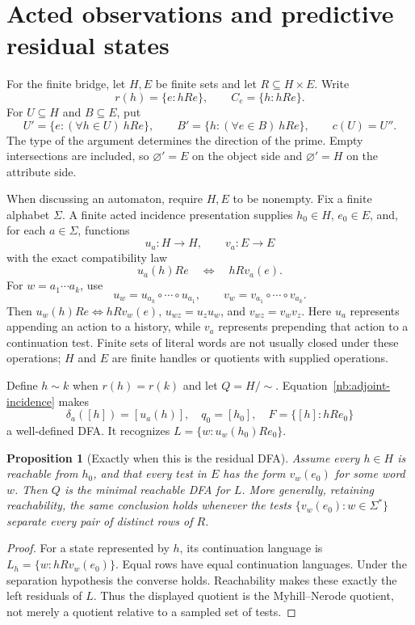 \documentclass[11pt]{article}
\newtheorem{proposition}[theorem]{Proposition}
\theoremstyle{remark}
\begin{document}
\section{Acted observations and predictive residual states}

For the finite bridge, let $H,E$ be finite sets and let $R\subseteq H\times E$. Write
\[
 r(h)=\{e:hRe\},\qquad C_e=\{h:hRe\}.
\]
For $U\subseteq H$ and $B\subseteq E$, put
\[
 U'=\{e:(\forall h\in U)\ hRe\},\qquad
 B'=\{h:(\forall e\in B)\ hRe\},\qquad c(U)=U''.
\]
The type of the argument determines the direction of the prime. Empty
intersections are included, so $\varnothing'=E$ on the object side and
$\varnothing'=H$ on the attribute side.

When discussing an automaton, require $H,E$ to be nonempty.
Fix a finite alphabet $\Sigma$. A finite acted incidence presentation supplies
$h_0\in H$, $e_0\in E$, and, for each $a\in\Sigma$, functions
\[
 u_a:H\longrightarrow H,\qquad v_a:E\longrightarrow E
\]
with the exact compatibility law
\begin{equation}
 u_a(h)Re\quad\Longleftrightarrow\quad hRv_a(e).
 \label{nb:adjoint-incidence}
\end{equation}
For $w=a_1\cdots a_k$, use
\[
 u_w=u_{a_k}\circ\cdots\circ u_{a_1},\qquad
 v_w=v_{a_1}\circ\cdots\circ v_{a_k}.
\]
Then $u_w(h)Re\Longleftrightarrow hRv_w(e)$,
$u_{wz}=u_z u_w$, and $v_{wz}=v_wv_z$.
Here $u_a$ represents appending an action to a history, while $v_a$
represents prepending that action to a continuation test. Finite sets of
literal words are not usually closed under these operations; $H$ and $E$
are finite handles or quotients with supplied operations.

Define $h\sim k$ when $r(h)=r(k)$ and let $Q=H/{\sim}$.
Equation~\eqref{nb:adjoint-incidence} makes
\[
 \delta_a([h])=[u_a(h)],\quad q_0=[h_0],\quad
 F=\{[h]:hRe_0\}
\]
a well-defined DFA. It recognizes
$L=\{w:u_w(h_0)Re_0\}$.

\begin{proposition}[Exactly when this is the residual DFA]
\label{nb:residual}
Assume every $h\in H$ is reachable from $h_0$, and that every test in $E$
has the form $v_w(e_0)$ for some word $w$. Then $Q$ is the minimal
reachable DFA for $L$. More generally, retaining reachability, the same conclusion holds whenever
the tests $\{v_w(e_0):w\in\Sigma^*\}$ separate every pair of distinct rows
of $R$.
\end{proposition}
\begin{proof}
For a state represented by $h$, its continuation language is
$L_h=\{w:hRv_w(e_0)\}$. Equal rows have equal continuation languages.
Under the separation hypothesis the converse holds. Reachability makes
these exactly the left residuals of $L$. Thus the displayed quotient is
the Myhill--Nerode quotient, not merely a quotient relative to a sampled
set of tests.
\end{proof}
\end{document}
